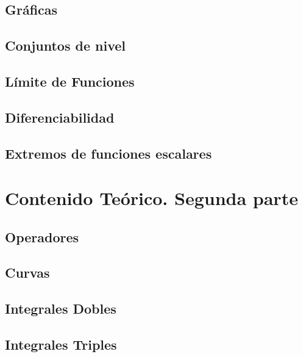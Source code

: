 \documentclass[10pt, a4paper]{report}
\begin{document}
        \section{Gráficas}
            
            
        \section{Conjuntos de nivel}
            
         
       \section{L\'imite de Funciones}
          
          
        \section{Diferenciabilidad}
            
        
        \section{Extremos de funciones escalares} 
           



    \chapter{Contenido Teórico. Segunda parte}
       \section{Operadores}
            
            
       \section{Curvas}
           
             
       \section{Integrales Dobles} 
          
       
       \section{Integrales Triples}
           
        
\end{document}
